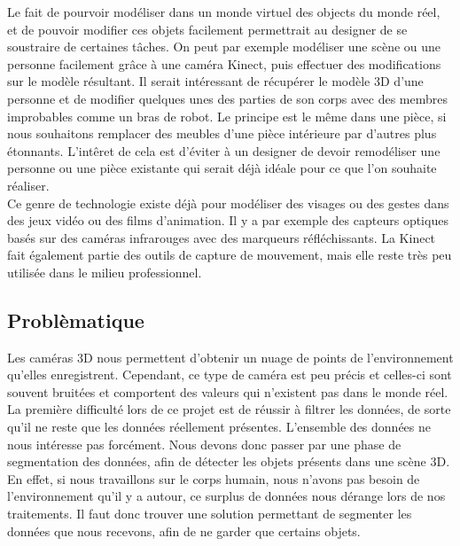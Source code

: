 Le fait de pourvoir modéliser dans un monde virtuel des objects du monde réel, et de pouvoir modifier ces 
objets facilement permettrait au designer de se soustraire de certaines tâches. On peut par exemple modéliser
une scène ou une personne facilement grâce à une caméra Kinect, puis effectuer des modifications sur le modèle résultant. Il serait
intéressant de récupérer le modèle 3D d'une personne et de modifier quelques unes des parties de son corps avec
des membres improbables comme un bras de robot. Le principe est le même dans une pièce, si nous souhaitons remplacer
des meubles d'une pièce intérieure par d'autres plus étonnants. L'intêret de cela est d'éviter à un designer de 
devoir remodéliser une personne ou une pièce existante qui serait déjà idéale pour ce que l'on souhaite réaliser.\\

Ce genre de technologie existe déjà pour modéliser des visages ou des gestes dans des jeux vidéo ou des films d'animation. 
Il y a par exemple des capteurs optiques basés sur des caméras infrarouges avec des marqueurs réfléchissants. La Kinect fait
également partie des outils de capture de mouvement, mais elle reste très peu utilisée dans le milieu professionnel.

\subsection{Problèmatique}
Les caméras 3D nous permettent d'obtenir un nuage de points de l'environnement qu'elles enregistrent. Cependant, ce 
type de caméra est peu précis et celles-ci sont souvent bruitées et comportent des valeurs qui n'existent pas dans le monde 
réel. 
La première difficulté lors de ce projet est de réussir à filtrer les données, de sorte qu'il ne reste que les données réellement présentes.
L'ensemble des données ne nous intéresse pas forcément. Nous devons donc passer par une phase de segmentation des données,
afin de détecter les objets présents dans une scène 3D.
En effet, si nous travaillons sur le corps humain, nous n'avons
pas besoin de l'environnement qu'il y a autour, ce surplus de données nous dérange lors de nos traitements. Il faut
donc trouver une solution permettant de segmenter les données que nous recevons, afin de ne garder que certains objets.\\ 
 
